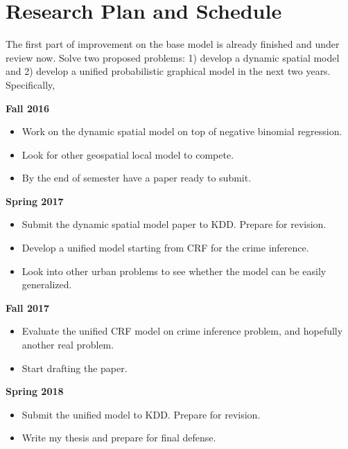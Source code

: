 \chapter{Research Plan and Schedule}



The first part of improvement on the base model is already finished and under review now. Solve two proposed problems: 1) develop a dynamic spatial model and 2) develop a unified probabilistic graphical model in the next two years.
Specifically,

\textbf{Fall 2016}
\begin{itemize}
\item Work on the dynamic spatial model on top of negative binomial regression.
\item Look for other geospatial local model to compete.
\item By the end of semester have a paper ready to submit.
\end{itemize}


\textbf{Spring 2017}
\begin{itemize}
\item Submit the dynamic spatial model paper to KDD. Prepare for revision.
\item Develop a unified model starting from CRF for the crime inference.
\item Look into other urban problems to see whether the model can be easily generalized.
\end{itemize}



\textbf{Fall 2017}
\begin{itemize}
\item Evaluate the unified CRF model on crime inference problem, and hopefully another real problem.
\item Start drafting the paper.
\end{itemize}



\textbf{Spring 2018}
\begin{itemize}
\item Submit the unified model to KDD. Prepare for revision.
\item Write my thesis and prepare for final defense.
\end{itemize}

